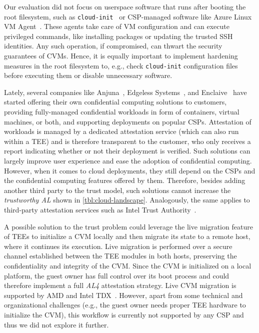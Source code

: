 Our evaluation did not focus on userspace software that runs after booting the
root filesystem, such as \texttt{cloud-init}~\cite{cloudInit} or
\ac{CSP}-managed software like Azure Linux VM Agent~\cite{azureDocsLinuxAgent}.
These agents take care of VM configuration and can execute privileged commands,
like installing packages or updating the trusted SSH identities. Any such
operation, if compromised, can thwart the security guarantees of
\acp{CVM}. Hence, it is equally important to implement hardening measures in the
root filesystem to, e.g., check \texttt{cloud-init} configuration files before
executing them or disable unnecessary software.

Lately, several companies like Anjuna~\cite{anjuna}, Edgeless
Systems~\cite{edgelessSystems}, and Enclaive~\cite{enclaive} have started
offering their own confidential computing solutions to customers, providing
fully-managed confidential workloads in form of containers, virtual machines, or
both, and supporting deployments on popular \acp{CSP}. Attestation of workloads
is managed by a dedicated attestation service (which can also run within a
\ac{TEE}) and is therefore transparent to the customer, who only receives a
report indicating whether or not their deployment is verified. Such solutions
can largely improve user experience and ease the adoption of confidential
computing. However, when it comes to cloud deployments, they still depend on the
\acp{CSP} and the confidential computing features offered by them.  Therefore,
besides adding another third party to the trust model, such solutions cannot
increase the \emph{trustworthy AL} shown in \cref{tbl:cloud-landscape}.
Analogously, the same applies to third-party attestation services such as Intel
Trust Authority~\cite{intelTrustAuthority}.

A possible solution to the trust problem could leverage the live migration
feature of \acp{TEE} to initialize a \ac{CVM} locally and then migrate its state
to a remote host, where it continues its execution. Live migration is performed
over a secure channel established between the \ac{TEE} modules in both hosts,
preserving the confidentiality and integrity of the \ac{CVM}. Since the \ac{CVM}
is initialized on a local platform, the guest owner has full control over its
boot process and could therefore implement a full \emph{AL4} attestation
strategy. Live \ac{CVM} migration is supported by AMD \sevsnp{} and Intel
\ac{TDX}~\cite{AmdSevSnpWhitepaper,intelTdxMigration}. However, apart from some
technical and organizational challenges (e.g., the guest owner needs proper
\ac{TEE} hardware to initialize the \ac{CVM}), this workflow is currently not
supported by any \ac{CSP} and thus we did not explore it further.

